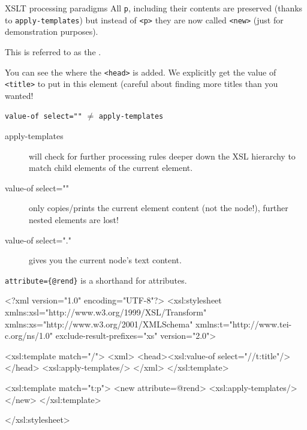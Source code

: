 \begin{frame}{XSLT processing paradigms}
\footnotesize{} 
All \texttt{p}, including their contents are preserved (thanks to \texttt{apply-templates}) but instead of \texttt{<p>} they are now called \texttt{<new>}  (just for demonstration purposes).

This is referred to as the .

You can see the  where the \texttt{<head>} is added. 
We explicitly get the value of \texttt{<title>} to put in this element (careful about finding more titles than you wanted!


\begin{exampleblock}{\texttt{value-of select=""} $\neq$ \texttt{apply-templates}}
\begin{description}
\item[apply-templates] will check for further processing rules deeper down the XSL hierarchy to match child elements of the current element.

\item[value-of select=""] only copies/prints the current element content (not the node!), further nested elements are lost!

\item[value-of select="."] gives you the current node's text content. 
\end{description}
\verb|attribute={@rend}| is a shorthand for attributes. 
\end{exampleblock}

\framebreak

\begin{xmlcode}
<?xml version="1.0" encoding="UTF-8"?>
<xsl:stylesheet xmlns:xsl="http://www.w3.org/1999/XSL/Transform"
    xmlns:xs="http://www.w3.org/2001/XMLSchema"
    xmlns:t="http://www.tei-c.org/ns/1.0"
    exclude-result-prefixes="xs"
    version="2.0">
       
    <xsl:template match="/">
        <xml>
            <head><xsl:value-of select="//t:title"/></head>
            <xsl:apply-templates/> 
        </xml>
    </xsl:template>
    
    <xsl:template match="t:p">
        <new attribute={@rend}>
            <xsl:apply-templates/>
        </new>
    </xsl:template>
    
</xsl:stylesheet>
\end{xmlcode}

\end{frame}

